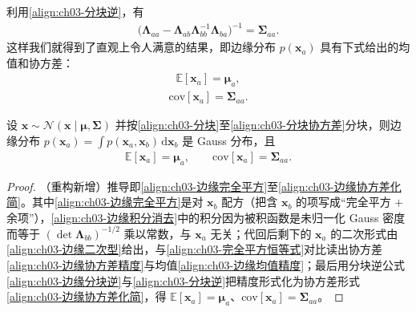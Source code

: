 \documentclass[../../main.tex]{subfiles}
\begin{document}
利用\eqref{align:ch03-分块逆}，有
\begin{align}
\bigl(\boldsymbol{\Lambda}_{aa}-\boldsymbol{\Lambda}_{ab}\boldsymbol{\Lambda}_{bb}^{-1}\boldsymbol{\Lambda}_{ba}\bigr)^{-1}=\boldsymbol{\Sigma}_{aa}.
\label{align:ch03-边缘协方差化简}
\end{align}
这样我们就得到了直观上令人满意的结果，即边缘分布 $p(\boldsymbol{x}_{a})$ 具有下式给出的均值和协方差：
\begin{align}
\mathbb{E}[\boldsymbol{x}_{a}]=\boldsymbol{\mu}_{a},
\label{align:ch03-边缘均值}
\end{align}
\begin{align}
\mathrm{cov}[\boldsymbol{x}_{a}]=\boldsymbol{\Sigma}_{aa}.
\label{align:ch03-边缘协方差}
\end{align}

\begin{proposition}[边缘 Gauss 分布]\label{proposition:ch03-边缘Gauss}
设 $\boldsymbol{x}\sim\mathcal{N}(\boldsymbol{x}\mid\boldsymbol{\mu},\boldsymbol{\Sigma})$ 并按\eqref{align:ch03-分块}至\eqref{align:ch03-分块协方差}分块，则边缘分布 $p(\boldsymbol{x}_{a})=\int p(\boldsymbol{x}_{a},\boldsymbol{x}_{b})\,\mathrm{d}\boldsymbol{x}_{b}$ 是 Gauss 分布，且
\begin{align*}
\mathbb{E}[\boldsymbol{x}_{a}]=\boldsymbol{\mu}_{a},\qquad \mathrm{cov}[\boldsymbol{x}_{a}]=\boldsymbol{\Sigma}_{aa}.
\end{align*}
\end{proposition}
\begin{proof}
（重构新增）推导即\eqref{align:ch03-边缘完全平方}至\eqref{align:ch03-边缘协方差化简}。其中\eqref{align:ch03-边缘完全平方}是对 $\boldsymbol{x}_{b}$ 配方（把含 $\boldsymbol{x}_{b}$ 的项写成“完全平方 $+$ 余项”），\eqref{align:ch03-边缘积分消去}中的积分因为被积函数是未归一化 Gauss 密度而等于 $(\det\boldsymbol{\Lambda}_{bb})^{-1/2}$ 乘以常数，与 $\boldsymbol{x}_{a}$ 无关；代回后剩下的 $\boldsymbol{x}_{a}$ 的二次形式由\eqref{align:ch03-边缘二次型}给出，与\eqref{align:ch03-完全平方恒等式}对比读出协方差\eqref{align:ch03-边缘协方差精度}与均值\eqref{align:ch03-边缘均值精度}；最后用分块逆公式\eqref{align:ch03-边缘分块逆}与\eqref{align:ch03-分块逆}把精度形式化为协方差形式\eqref{align:ch03-边缘协方差化简}，得 $\mathbb{E}[\boldsymbol{x}_{a}]=\boldsymbol{\mu}_{a}$、$\mathrm{cov}[\boldsymbol{x}_{a}]=\boldsymbol{\Sigma}_{aa}$。
\end{proof}
\end{document}
